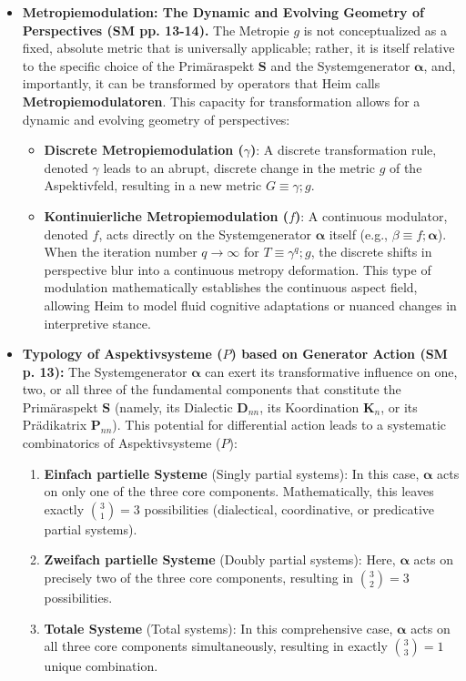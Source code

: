 \documentclass[12pt]{article}
\newcommand{\aspektivsystem}{P}
\begin{document}
\begin{itemize}
    \item \textbf{Metropiemodulation: The Dynamic and Evolving Geometry of Perspectives (SM pp. 13-14).}
    The Metropie \( g \) is not conceptualized as a fixed, absolute metric that is universally applicable; rather, it is itself relative to the specific choice of the Primäraspekt \( \mathbf{S} \) and the Systemgenerator \( \bm{\alpha} \), and, importantly, it can be transformed by operators that Heim calls \textbf{Metropiemodulatoren}. This capacity for transformation allows for a dynamic and evolving geometry of perspectives:
    \begin{itemize}
        \item \textbf{Discrete Metropiemodulation (\( \gamma \))}: A discrete transformation rule, denoted \( \gamma \) leads to an abrupt, discrete change in the metric \(g\) of the Aspektivfeld, resulting in a new metric \( G \equiv \gamma;g \).
        \item \textbf{Kontinuierliche Metropiemodulation (\( f \))}: A continuous modulator, denoted \( f \), acts directly on the Systemgenerator \( \bm{\alpha} \) itself (e.g., \( \beta \equiv f;\bm{\alpha} \)). When the iteration number $q \to \infty$ for $T \equiv \gamma^q ; g$, the discrete shifts in perspective blur into a continuous metropy deformation. This type of modulation mathematically establishes the continuous aspect field, allowing Heim to model fluid cognitive adaptations or nuanced changes in interpretive stance.
    \end{itemize}

    \item \textbf{Typology of Aspektivsysteme (\(\aspektivsystem\)) based on Generator Action (SM p. 13):}
    The Systemgenerator \( \bm{\alpha} \) can exert its transformative influence on one, two, or all three of the fundamental components that constitute the Primäraspekt \( \mathbf{S} \) (namely, its Dialectic \( \mathbf{D}_{nn} \), its Koordination \( \mathbf{K}_n \), or its Prädikatrix \( \mathbf{P}_{nn} \)). This potential for differential action leads to a systematic combinatorics of Aspektivsysteme (\(\aspektivsystem\)):
    \begin{enumerate}
        \item \textbf{Einfach partielle Systeme} (Singly partial systems): In this case, \( \bm{\alpha} \) acts on only one of the three core components. Mathematically, this leaves exactly \(\binom{3}{1} = 3\) possibilities (dialectical, coordinative, or predicative partial systems).
        \item \textbf{Zweifach partielle Systeme} (Doubly partial systems): Here, \( \bm{\alpha} \) acts on precisely two of the three core components, resulting in \(\binom{3}{2} = 3\) possibilities.
        \item \textbf{Totale Systeme} (Total systems): In this comprehensive case, \( \bm{\alpha} \) acts on all three core components simultaneously, resulting in exactly \(\binom{3}{3} = 1\) unique combination.
    \end{enumerate}


\end{itemize}
\end{document}
